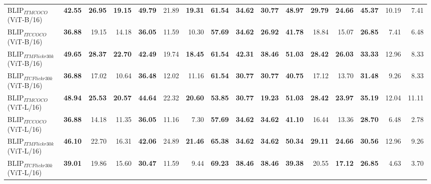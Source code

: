\begin{table}[ht]
\begin{adjustbox}{max width=\textwidth}
\begin{tabular}{l|rrr|rrr|rrr|rrr|rrr}
 BLIP$_{ITM COCO}$ (ViT-B/16)        & \textbf{42.55} & \textbf{26.95} & \textbf{19.15} & \textbf{49.79} & 21.89          & \textbf{19.31} & \textbf{61.54} & \textbf{34.62} & \textbf{30.77} & \textbf{48.97} & \textbf{29.79} & \textbf{24.66} & \textbf{45.37} & 10.19          & 7.41           \\
 BLIP$_{ITC COCO}$ (ViT-B/16)        & \textbf{36.88} & 19.15          & 14.18          & \textbf{36.05} & 11.59          & 10.30          & \textbf{57.69} & \textbf{34.62} & \textbf{26.92} & \textbf{41.78} & 18.84          & 15.07          & \textbf{26.85} & 7.41           & 6.48           \\
 BLIP$_{ITM Flickr30k}$ (ViT-B/16)   & \textbf{49.65} & \textbf{28.37} & \textbf{22.70} & \textbf{42.49} & 19.74          & \textbf{18.45} & \textbf{61.54} & \textbf{42.31} & \textbf{38.46} & \textbf{51.03} & \textbf{28.42} & \textbf{26.03} & \textbf{33.33} & 12.96          & 8.33           \\
 BLIP$_{ITC Flickr30k}$ (ViT-B/16)   & \textbf{36.88} & 17.02          & 10.64          & \textbf{36.48} & 12.02          & 11.16          & \textbf{61.54} & \textbf{30.77} & \textbf{30.77} & \textbf{40.75} & 17.12          & 13.70          & \textbf{31.48} & 9.26           & 8.33           \\
 BLIP$_{ITM COCO}$ (ViT-L/16)        & \textbf{48.94} & \textbf{25.53} & \textbf{20.57} & \textbf{44.64} & 22.32          & \textbf{20.60} & \textbf{53.85} & \textbf{30.77} & \textbf{19.23} & \textbf{51.03} & \textbf{28.42} & \textbf{23.97} & \textbf{35.19} & 12.04          & 11.11          \\
 BLIP$_{ITC COCO}$ (ViT-L/16)        & \textbf{36.88} & 14.18          & 11.35          & \textbf{36.05} & 11.16          & 7.30           & \textbf{57.69} & \textbf{34.62} & \textbf{34.62} & \textbf{41.10} & 16.44          & 13.36          & \textbf{28.70} & 6.48           & 2.78           \\
 BLIP$_{ITM Flickr30k}$ (ViT-L/16)   & \textbf{46.10} & 22.70          & 16.31          & \textbf{42.06} & 24.89          & \textbf{21.46} & \textbf{65.38} & \textbf{34.62} & \textbf{34.62} & \textbf{50.34} & \textbf{29.11} & \textbf{24.66} & \textbf{30.56} & 12.96          & 9.26           \\
 BLIP$_{ITC Flickr30k}$ (ViT-L/16)   & \textbf{39.01} & 19.86          & 15.60          & \textbf{30.47} & 11.59          & 9.44           & \textbf{69.23} & \textbf{38.46} & \textbf{38.46} & \textbf{39.38} & 20.55          & \textbf{17.12} & \textbf{26.85} & 4.63           & 3.70           \\

\end{tabular}
\end{adjustbox}
\end{table}
